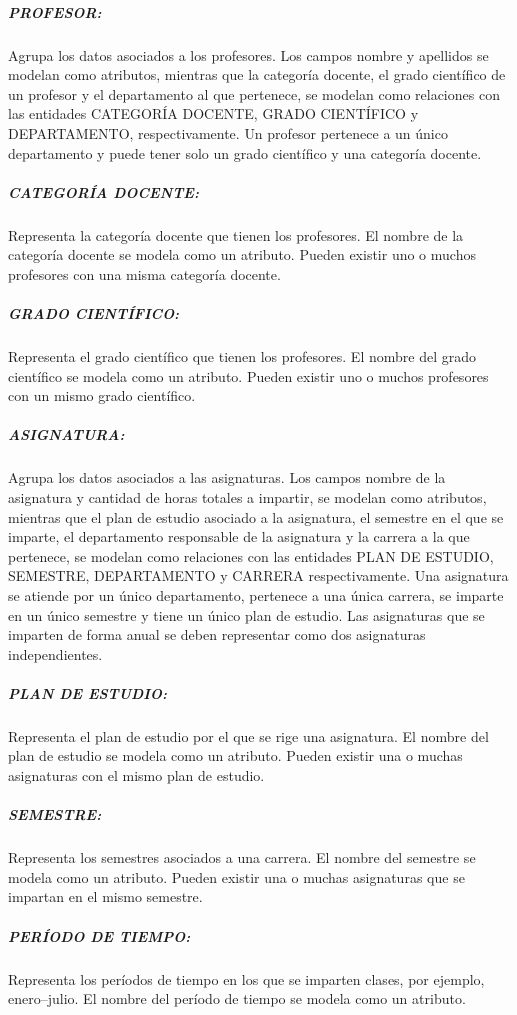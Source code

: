 \subparagraph{PROFESOR:}
Agrupa los datos asociados a los profesores.
Los campos nombre y apellidos se modelan como atributos,  
mientras que la categoría docente, el grado 
científico de un profesor y el departamento al que pertenece, se modelan como 
relaciones con las entidades CATEGORÍA DOCENTE, GRADO CIENTÍFICO y 
DEPARTAMENTO, respectivamente. Un profesor pertenece a un único departamento y puede tener solo 
un grado científico y una categoría docente. 


\subparagraph{CATEGORÍA DOCENTE:}
Representa la categoría docente que tienen los profesores.
El nombre de la categoría docente se modela como un atributo. 
Pueden existir uno o muchos profesores con una misma categoría docente.

\subparagraph{GRADO CIENTÍFICO:}
Representa el grado científico que tienen los profesores.
El nombre del grado científico se modela como un atributo.
Pueden existir uno o muchos profesores con un mismo grado científico.





\subparagraph{ASIGNATURA:}
Agrupa los datos asociados a las asignaturas.
Los campos nombre de la asignatura y cantidad de horas 
totales a impartir, se modelan como atributos, mientras que
el plan de estudio asociado a la asignatura, el semestre en el que se 
imparte, el departamento responsable de la asignatura y la carrera a la 
que pertenece, se modelan como relaciones con las entidades
PLAN DE ESTUDIO, SEMESTRE, DEPARTAMENTO y CARRERA respectivamente. Una asignatura 
se atiende por un único departamento, pertenece a una única carrera, se imparte en un 
único semestre y tiene un único plan de estudio. Las asignaturas que se imparten de forma 
anual se deben representar como dos asignaturas independientes.

\subparagraph{PLAN DE ESTUDIO:}
Representa el plan de estudio por el que se rige una asignatura.
El nombre del plan de estudio se modela como un atributo.
Pueden existir una o muchas asignaturas con el mismo plan de estudio.



\subparagraph{SEMESTRE:}
Representa los semestres asociados a una carrera. 
El nombre del semestre se modela como un atributo.
Pueden existir una o muchas asignaturas que se impartan en 
el mismo semestre. 

\subparagraph{PERÍODO DE TIEMPO:}
Representa los períodos de tiempo en los que se imparten clases, por ejemplo, enero--julio.
El nombre del período de tiempo se modela como un atributo.


